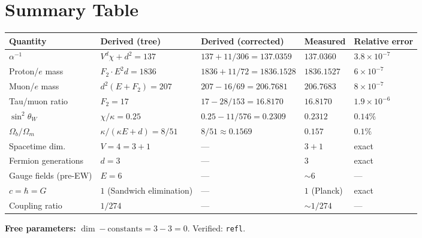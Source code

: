 \documentclass[11pt,a4paper]{article}
\theoremstyle{definition}
\begin{document}
\section{Summary Table}
\label{sec:summary}

\begin{center}
\small
\renewcommand{\arraystretch}{1.35}
\begin{tabular}{@{}lllll@{}}
\toprule
\textbf{Quantity} & \textbf{Derived (tree)} & \textbf{Derived (corrected)} & \textbf{Measured}
  & \textbf{Relative error} \\
\midrule
$\alpha^{-1}$              & $V^d\chi + d^2 = 137$         & $137 + 11/306 = 137.0359$ & $137.0360$ & $3.8\times10^{-7}$ \\
Proton/$e$ mass            & $F_2 \cdot E^2 d = 1836$      & $1836 + 11/72 = 1836.1528$ & $1836.1527$ & $6\times10^{-7}$ \\
Muon/$e$ mass              & $d^2(E+F_2) = 207$            & $207 - 16/69 = 206.7681$ & $206.7683$ & $8\times10^{-7}$ \\
Tau/muon ratio             & $F_2 = 17$                    & $17 - 28/153 = 16.8170$ & $16.8170$ & $1.9\times10^{-6}$ \\
$\sin^2\theta_W$           & $\chi/\kappa = 0.25$          & $0.25 - 11/576 = 0.2309$ & $0.2312$ & $0.14\%$ \\
$\Omega_b/\Omega_m$        & $\kappa/(\kappa E + d) = 8/51$& $8/51 \approx 0.1569$ & $0.157$ & $0.1\%$ \\
\midrule
Spacetime dim.             & $V = 4 = 3{+}1$               & ---                      & $3{+}1$ & exact \\
Fermion generations        & $d = 3$                       & ---                      & $3$     & exact \\
Gauge fields (pre-EW)      & $E = 6$                       & ---                      & $\sim 6$ & --- \\
$c = \hbar = G$            & $1$ (Sandwich elimination)    & ---                      & $1$ (Planck) & exact \\
Coupling ratio             & $1/274$                       & ---                      & $\sim 1/274$ & --- \\
\bottomrule
\end{tabular}
\end{center}

\medskip
\noindent
\textbf{Free parameters:} $\dim - \text{constants} = 3 - 3 = 0$.  Verified: \texttt{refl}.
\end{document}
